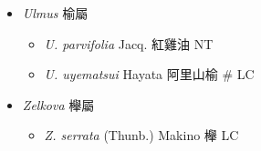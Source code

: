 
  \begin{itemize}
 \item[] \textit{Ulmus} 榆屬
                                
  \begin{itemize}
        \item[] \textit{U. parvifolia} Jacq.  紅雞油   NT
        \item[] \textit{U. uyematsui} Hayata  阿里山榆  \# LC
  \end{itemize}
 \item[] \textit{Zelkova} 櫸屬
                                
  \begin{itemize}
        \item[] \textit{Z. serrata} (Thunb.) Makino  櫸   LC
  \end{itemize}
  \end{itemize}
